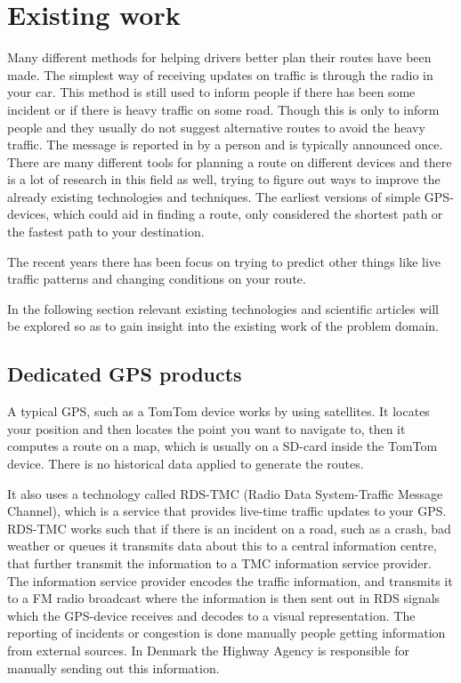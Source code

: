 \section{Existing work}
Many different methods for helping drivers better plan their routes have been made.
The simplest way of receiving updates on traffic is through the radio in your car. This method is still used to inform people if there has been some incident or if there is heavy traffic on some road. Though this is only to inform people and they usually do not suggest alternative routes to avoid the heavy traffic. The message is reported in by a person and is typically announced once.
There are many different tools for planning a route on different devices and there is a lot of research in this field as well, trying to figure out ways to improve the already existing technologies and techniques. The earliest versions of simple GPS-devices, which could aid in finding a route, only considered the shortest path or the fastest path to your destination.

The recent years there has been focus on trying to predict other things like live traffic patterns and changing conditions on your route.

In the following section relevant existing technologies and scientific articles will be explored so as to gain insight into the existing work of the problem domain.
\subsection*{Dedicated GPS products}
A typical GPS, such as a TomTom device works by using satellites. It locates your position and then locates the point you want to navigate to, then it computes a route on a map, which is usually on a SD-card inside the TomTom device. There is no historical data applied to generate the routes.

It also uses a technology called RDS-TMC (Radio Data System-Traffic Message Channel), which is a service that provides live-time traffic updates to your GPS. RDS-TMC works such that if there is an incident on a road, such as a crash, bad weather or queues it transmits data about this to a central information centre, that further transmit the information to a TMC information service provider. The information service provider encodes the traffic information, and transmits it to a FM radio broadcast where the information is then sent out in RDS signals which the GPS-device receives and decodes to a visual representation. The reporting of incidents or congestion is done manually people getting information from external sources. In Denmark the Highway Agency is responsible for manually sending out this information\cite{Vejdirektorat}. 

